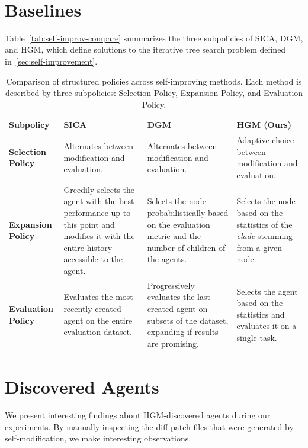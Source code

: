 \documentclass{article} %
\begin{document}
\
\newpage
\section{Baselines}\label{app:baselines}



Table~\ref{tab:self-improv-compare} summarizes the three subpolicies of SICA, DGM, and HGM, which define solutions to the iterative tree search problem defined in~\ref{sec:self-improvement}.
\begin{table}[htbp]
\centering
\renewcommand{\arraystretch}{1.25}
\begin{tabularx}{\textwidth}{p{2.2cm} X X X}

\toprule
\textbf{Subpolicy} & \textbf{SICA} & \textbf{DGM} & \textbf{HGM (Ours)} \\
\midrule
\textbf{Selection Policy} 
& Alternates between modification and evaluation. 
& Alternates between modification and evaluation. 
& Adaptive choice between modification and evaluation. \\
\midrule
\textbf{Expansion Policy} 
& Greedily selects the agent with the best performance up to this point and modifies it with the entire history accessible to the agent. 
& Selects the node probabilistically based on the evaluation metric and the number of children of the agents. 
& Selects the node based on the statistics of the \emph{clade} stemming from a given node.\\
\midrule
\textbf{Evaluation Policy} 
& Evaluates the most recently created agent on the entire evaluation dataset. 
& Progressively evaluates the last created agent on subsets of the dataset, expanding if results are promising. 
& Selects the agent based on the statistics and evaluates it on a single task. \\
\bottomrule
\end{tabularx}
\caption{Comparison of structured policies across self-improving methods. Each method is described by three subpolicies: Selection Policy, Expansion Policy, and Evaluation Policy. }
\label{tab:structured_policy}
\end{table}

\newpage
\section{Discovered Agents}
We present interesting findings about HGM-discovered agents during our experiments. 
By manually inspecting the diff patch files that were generated by self-modification, we make interesting observations.
\end{document}
